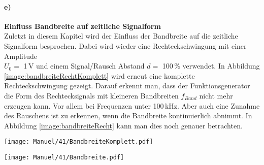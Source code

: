 \paragraph{e)}\textbf{Einfluss Bandbreite auf zeitliche Signalform}\\
Zuletzt in diesem Kapitel wird der Einfluss der Bandbreite auf die zeitliche Signalform besprochen. Dabei wird wieder eine Rechteckschwingung mit einer Amplitude\\ $U_0=$ 1\,V und einem Signal/Rausch Abstand $d=$ 100\,\% verwendet. In Abbildung \ref{image:bandbreiteRechtKomplett} wird erneut eine komplette Rechteckschwingung gezeigt. Darauf erkennt man, dass der Funktionsgenerator die Form des Rechtecksignals mit kleineren Bandbreiten $f_{Band}$ nicht mehr erzeugen kann. Vor allem bei Frequenzen unter 100\,kHz. Aber auch eine Zunahme des Rauschens ist zu erkennen, wenn die Bandbreite kontinuierlich abnimmt. In Abbildung \ref{image:bandbreiteRecht} kann man dies noch genauer betrachten. 
\newpage
\begin{center}
    \texttt{[image: Manuel/41/BandbreiteKomplett.pdf]}
    \label{image:bandbreiteRechtKomplett}
\end{center}
\begin{center}
    \texttt{[image: Manuel/41/Bandbreite.pdf]}
    \label{image:bandbreiteRecht}
\end{center} 
